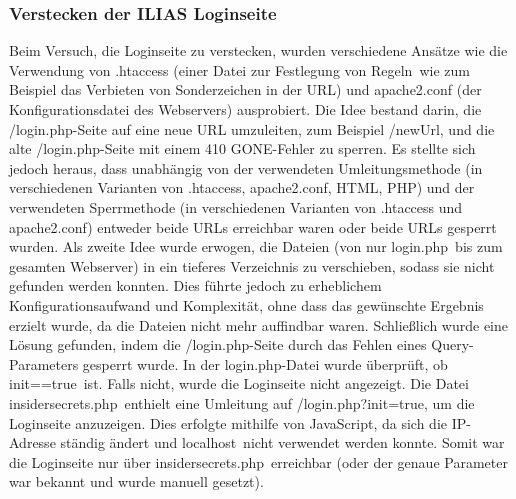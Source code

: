\documentclass[10pt, a4paper,onecolumn ,titlepage]{article}
\begin{document}
    \subsubsection{Verstecken der ILIAS Loginseite}
    \label{subsubsec:lessonslearnedLogin}
    Beim Versuch, die Loginseite zu verstecken, wurden verschiedene Ansätze wie die Verwendung von .htaccess (einer Datei zur Festlegung von \glqq Regeln\grqq\ wie zum Beispiel das Verbieten von Sonderzeichen in der URL) und apache2.conf (der Konfigurationsdatei des Webservers) ausprobiert.
    Die Idee bestand darin, die \glqq /login.php\grqq-Seite auf eine neue URL umzuleiten, zum Beispiel \glqq /newUrl\grqq, und die alte \glqq /login.php\grqq-Seite mit einem 410 GONE-Fehler zu sperren.
    Es stellte sich jedoch heraus, dass unabhängig von der verwendeten Umleitungsmethode (in verschiedenen Varianten von .htaccess, apache2.conf, HTML, PHP) und der verwendeten Sperrmethode (in verschiedenen Varianten von .htaccess und apache2.conf) entweder beide URLs erreichbar waren oder beide URLs gesperrt wurden.
    Als zweite Idee wurde erwogen, die Dateien (von nur \glqq login.php\grqq\ bis zum gesamten Webserver) in ein tieferes Verzeichnis zu verschieben, sodass sie nicht gefunden werden konnten.
    Dies führte jedoch zu erheblichem Konfigurationsaufwand und Komplexität, ohne dass das gewünschte Ergebnis erzielt wurde, da die Dateien nicht mehr auffindbar waren.
    Schließlich wurde eine Lösung gefunden, indem die \glqq /login.php\grqq-Seite durch das Fehlen eines Query-Parameters gesperrt wurde.
    In der \glqq login.php\grqq-Datei wurde überprüft, ob \glqq init==true\grqq\ ist.
    Falls nicht, wurde die Loginseite nicht angezeigt.
    Die Datei \glqq insidersecrets.php\grqq\ enthielt eine Umleitung auf \glqq /login.php?init=true\grqq, um die Loginseite anzuzeigen.
    Dies erfolgte mithilfe von JavaScript, da sich die IP-Adresse ständig ändert und \glqq localhost\grqq\ nicht verwendet werden konnte.
    Somit war die Loginseite nur über \glqq insidersecrets.php\grqq\ erreichbar (oder der genaue Parameter war bekannt und wurde manuell gesetzt).

\end{document}
